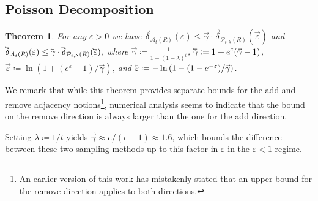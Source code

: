 \documentclass{article}
\newcommand{\Arxiv}[1]{}
\newcommand{\Arxiv}[1]{#1}
\theoremstyle{plain}
\newtheorem{theorem}{Theorem}[section]
\theoremstyle{definition}
\newcommand{\eps}{\varepsilon}
\newcommand{\lvec}[1]{\reflectbox{$\vec{\reflectbox{$#1$}}$}}
\newcommand{\rand}{R}
\newcommand{\Pois}[2]{\mathcal{P}_{#1}\left(#2\right)}
\newcommand{\alloc}[2]{\mathcal{A}_{#1}\left(#2\right)}
\newcommand{\add}[1]{\lvec{#1}}
\newcommand{\rem}[1]{\vec{#1}}
\newcommand{\privProfAdd}[1]{\add{\delta}_{#1}}
\newcommand{\privProfRem}[1]{\rem{\delta}_{#1}}
\begin{document}
\subsection{Poisson Decomposition}\label{sec:PoisDecom}

\begin{theorem}\Arxiv{[Decomposition bound]}\label{thm:dcmpBnd}
    For any $\eps > 0$ we have $\privProfRem{\alloc{t}{\rand}}(\eps) \le \rem{\gamma} \cdot \privProfRem{\Pois{t, \lambda}{\rand}}(\rem{\eps})$ and $\privProfAdd{\alloc{t}{\rand}}(\eps) \le \add{\gamma} \cdot \privProfAdd{\Pois{t, \lambda}{\rand}}(\add{\eps})$, where $\rem{\gamma} \coloneqq \frac{1}{1 - \left(1 - \lambda \right)^{t}}$, $\add{\gamma} \coloneqq 1  + e^{\eps}(\rem{\gamma}-1)$, $\rem{\eps} \coloneqq \ln (1 + (e^{\eps} - 1)/\rem{\gamma})$, and $\add{\eps} \coloneqq -\ln\left(1 - (1-e^{-\eps})/\rem{\gamma}\right)$.
\end{theorem}

We remark that while this theorem provides separate bounds for the add and remove adjacency notions\footnote{An earlier version of this work has mistakenly stated that an upper bound for the remove direction applies to both directions.}, numerical analysis seems to indicate that the bound on the remove direction is always larger than the one for the add direction.

Setting $\lambda \coloneqq 1/t$ yields $\rem{\gamma} \approx e/(e-1) \approx 1.6$, which bounds the difference between these two sampling methods up to this factor in $\eps$ in the $\eps < 1$ regime.
\end{document}
